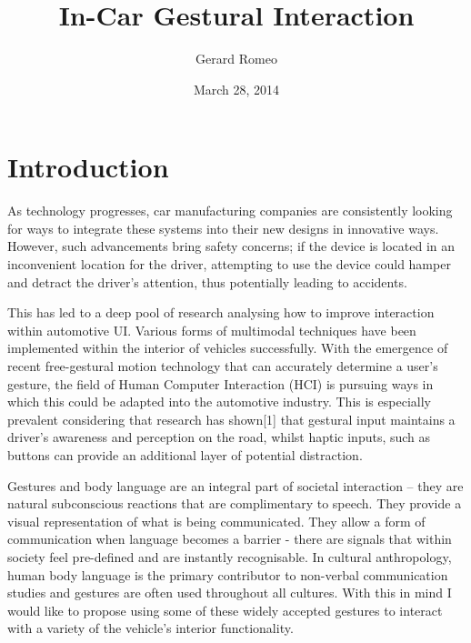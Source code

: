 \documentclass{l4proj}
\begin{document}
\title{In-Car Gestural Interaction}
\author{Gerard Romeo}
\date{March 28, 2014}
\maketitle

\begin{abstract}
\end{abstract}

\educationalconsent
%
%
\tableofcontents

\chapter{Introduction}
\label{sec:intro}
\vspace{-3mm}
As technology progresses, car manufacturing companies are consistently looking for ways to integrate these systems into their new designs in innovative ways. However, such advancements bring safety concerns; if the device is located in an inconvenient location for the driver, attempting to use the device could hamper and detract the driver’s attention, thus potentially leading to accidents.

This has led to a deep pool of research analysing how to improve interaction within automotive UI. Various forms of multimodal techniques have been implemented within the interior of vehicles successfully. With the emergence of recent free-gestural motion technology that can accurately determine a user's gesture, the field of Human Computer Interaction (HCI) is pursuing ways in which this could be adapted into the automotive industry. This is especially prevalent considering that research has shown[1] that gestural input maintains a driver’s awareness and perception on the road, whilst haptic inputs, such as buttons can provide an additional layer of potential distraction.  

Gestures and body language are an integral part of societal interaction -- they are natural subconscious reactions that are complimentary to speech. They provide a visual representation of what is being communicated. They allow a form of communication when language becomes a barrier - there are signals that within society feel pre-defined and are instantly recognisable. In cultural anthropology, human body language is the primary contributor to non-verbal communication studies and gestures are often used throughout all cultures. With this in mind I would like to propose using some of these widely accepted gestures to interact with a variety of the vehicle's interior functionality. 
\end{document}
